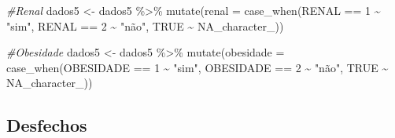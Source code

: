 \documentclass[
]{article}
\newenvironment{Shaded}{\begin{snugshade}}{\end{snugshade}}
\newcommand{\AttributeTok}[1]{\textcolor[rgb]{0.77,0.63,0.00}{#1}}
\newcommand{\CommentTok}[1]{\textcolor[rgb]{0.56,0.35,0.01}{\textit{#1}}}
\newcommand{\ConstantTok}[1]{\textcolor[rgb]{0.00,0.00,0.00}{#1}}
\newcommand{\DecValTok}[1]{\textcolor[rgb]{0.00,0.00,0.81}{#1}}
\newcommand{\FunctionTok}[1]{\textcolor[rgb]{0.00,0.00,0.00}{#1}}
\newcommand{\NormalTok}[1]{#1}
\newcommand{\OtherTok}[1]{\textcolor[rgb]{0.56,0.35,0.01}{#1}}
\newcommand{\SpecialCharTok}[1]{\textcolor[rgb]{0.00,0.00,0.00}{#1}}
\newcommand{\StringTok}[1]{\textcolor[rgb]{0.31,0.60,0.02}{#1}}
\begin{document}
\begin{Shaded}
\begin{Highlighting}[]
\CommentTok{\#Renal}
\NormalTok{dados5 }\OtherTok{\textless{}{-}}\NormalTok{  dados5 }\SpecialCharTok{\%\textgreater{}\%}
  \FunctionTok{mutate}\NormalTok{(}\AttributeTok{renal =} \FunctionTok{case\_when}\NormalTok{(RENAL }\SpecialCharTok{==} \DecValTok{1} \SpecialCharTok{\textasciitilde{}} \StringTok{"sim"}\NormalTok{,}
\NormalTok{                           RENAL }\SpecialCharTok{==} \DecValTok{2} \SpecialCharTok{\textasciitilde{}} \StringTok{"não"}\NormalTok{,}
                           \ConstantTok{TRUE} \SpecialCharTok{\textasciitilde{}} \ConstantTok{NA\_character\_}\NormalTok{))}

\CommentTok{\#Obesidade}
\NormalTok{dados5 }\OtherTok{\textless{}{-}}\NormalTok{  dados5 }\SpecialCharTok{\%\textgreater{}\%}
  \FunctionTok{mutate}\NormalTok{(}\AttributeTok{obesidade =} \FunctionTok{case\_when}\NormalTok{(OBESIDADE }\SpecialCharTok{==} \DecValTok{1} \SpecialCharTok{\textasciitilde{}} \StringTok{"sim"}\NormalTok{,}
\NormalTok{                               OBESIDADE }\SpecialCharTok{==} \DecValTok{2} \SpecialCharTok{\textasciitilde{}} \StringTok{"não"}\NormalTok{,}
                               \ConstantTok{TRUE} \SpecialCharTok{\textasciitilde{}} \ConstantTok{NA\_character\_}\NormalTok{))}
\end{Highlighting}
\end{Shaded}

\hypertarget{desfechos}{%
\subsection{Desfechos}\label{desfechos}}
\end{document}
